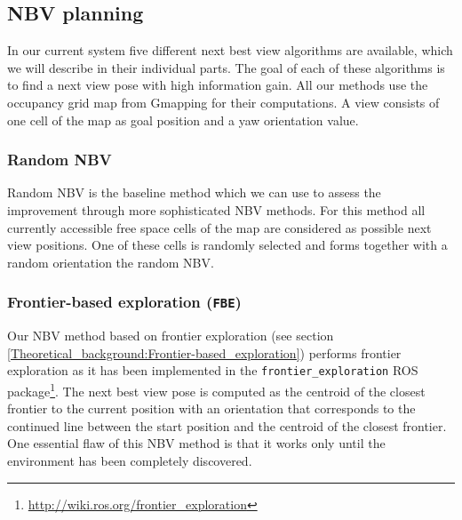 \documentclass[a4paper,11pt,english]{article}
\begin{document}




\subsection{NBV planning}
In our current system five different next best view algorithms are available, which we will describe in their individual parts.
The goal of each of these algorithms is to find a next view pose with high information gain.
All our methods use the occupancy grid map from Gmapping for their computations.
A view consists of one cell of the map as goal position and a yaw orientation value.

\subsubsection{Random NBV}
Random NBV is the baseline method which we can use to assess the improvement through more sophisticated NBV methods.
For this method all currently accessible free space cells of the map are considered as possible next view positions.
One of these cells is randomly selected and forms together with a random orientation the random NBV.

\subsubsection{Frontier-based exploration (\texttt{FBE})}
Our NBV method based on frontier exploration (see section \ref{Theoretical_background:Frontier-based_exploration}) performs frontier exploration as it has been implemented in the \texttt{frontier\_exploration} ROS package\footnote{\url{http://wiki.ros.org/frontier_exploration}}.
The next best view pose is computed as the centroid of the closest frontier to the current position with an orientation that corresponds to the continued line between the start position and the centroid of the closest frontier.
One essential flaw of this NBV method is that it works only until the environment has been completely discovered.
\end{document}
